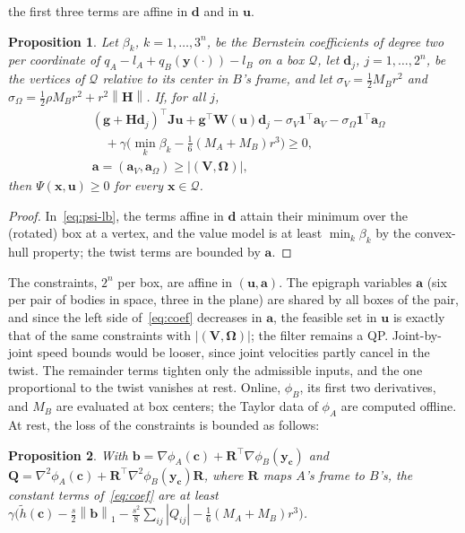 \documentclass[journal]{IEEEtran}
\newtheorem{proposition}{Proposition}
\theoremstyle{definition}
\newcommand{\norm}[1]{\left\lVert #1\right\rVert}
\newcommand{\Rot}{\mathbf{R}}
\begin{document}
the first three terms are affine in $\mathbf d$ and in $\mathbf u$.
\begin{proposition}\label{prop:coef}
Let $\beta_k$, $k=1,\dots,3^n$, be the Bernstein coefficients of degree two per coordinate of
$q_A-l_A+q_B(\mathbf y(\cdot))-l_B$ on a box $\mathcal Q$, let $\mathbf d_j$, $j=1,\dots,2^n$, be the
vertices of $\mathcal Q$ relative to its center in $B$'s frame, and let
$\sigma_V=\frac12M_Br^2$ and $\sigma_\Omega=\frac12\rho M_Br^2+r^2\norm{\mathbf H}$. If, for all $j$,
\begin{equation}\label{eq:coef}
\begin{aligned}
&(\mathbf g+\mathbf H\mathbf d_j)^\top\mathbf J\mathbf u+\mathbf g^\top\mathbf W(\mathbf u)\mathbf d_j
-\sigma_V\mathbf 1^{\!\top}\mathbf a_V-\sigma_\Omega\mathbf 1^{\!\top}\mathbf a_\Omega\\
&\quad+\gamma\big(\min_k\beta_k-\tfrac16(M_A+M_B)r^3\big)\ge0,\\
&\mathbf a=(\mathbf a_V,\mathbf a_\Omega)\ge|(\mathbf V,\boldsymbol\Omega)|,
\end{aligned}
\end{equation}
then $\Psi(\mathbf x,\mathbf u)\ge0$ for every $\mathbf x\in\mathcal Q$.
\end{proposition}
\begin{proof}
In~\eqref{eq:psi-lb}, the terms affine in $\mathbf d$ attain their minimum over the (rotated) box at a
vertex, and the value model is at least $\min_k\beta_k$ by the convex-hull property; the twist terms
are bounded by $\mathbf a$.
\end{proof}
The constraints, $2^n$ per box, are affine in $(\mathbf u,\mathbf a)$. The epigraph variables $\mathbf a$ (six per pair of
bodies in space, three in the plane) are shared by all boxes of the pair, and since the left side
of~\eqref{eq:coef} decreases in $\mathbf a$, the feasible set in $\mathbf u$ is exactly that of the same
constraints with $|(\mathbf V,\boldsymbol\Omega)|$; the filter remains a QP. Joint-by-joint speed bounds
would be looser, since joint velocities partly cancel in the twist.
The remainder terms tighten only the admissible inputs, and the one
proportional to the twist vanishes at rest. Online, $\phi_B$, its first two derivatives, and $M_B$ are
evaluated at box centers; the Taylor data of $\phi_A$ are computed offline. At rest, the loss of the
constraints is bounded as follows:
\begin{proposition}\label{prop:tight}
With $\mathbf b=\nabla\phi_A(\mathbf c)+\Rot^\top\nabla\phi_B(\mathbf y_{\mathbf c})$ and
$\mathbf Q=\nabla^2\phi_A(\mathbf c)+\Rot^\top\nabla^2\phi_B(\mathbf y_{\mathbf c})\Rot$, where
$\Rot$ maps $A$'s frame to $B$'s, the constant terms of~\eqref{eq:coef} are at least
$\gamma\big(\tilde h(\mathbf c)-\tfrac s2\norm{\mathbf b}_1-\tfrac{s^2}8\sum_{ij}|Q_{ij}|
-\tfrac16(M_A+M_B)r^3\big)$.
\end{proposition}
\end{document}
